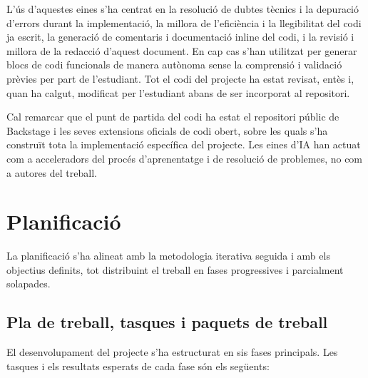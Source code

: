\documentclass[11pt,a4paper]{article}
\newcommand{\sectionintro}[1]{%
  \vspace{0.25em}%
  #1\par
}
\begin{document}
L'\'us d'aquestes eines s'ha centrat en la resoluci\'o de dubtes t\`ecnics i la depuraci\'o d'errors durant la implementaci\'o, la millora de l'efici\`encia i la llegibilitat del codi ja escrit, la generaci\'o de comentaris i documentaci\'o inline del codi, i la revisi\'o i millora de la redacci\'o d'aquest document. En cap cas s'han utilitzat per generar blocs de codi funcionals de manera aut\`onoma sense la comprensi\'o i validaci\'o pr\`evies per part de l'estudiant. Tot el codi del projecte ha estat revisat, ent\`es i, quan ha calgut, modificat per l'estudiant abans de ser incorporat al repositori.

Cal remarcar que el punt de partida del codi ha estat el repositori p\'ublic de Backstage i les seves extensions oficials de codi obert, sobre les quals s'ha constru\"it tota la implementaci\'o espec\'ifica del projecte. Les eines d'IA han actuat com a acceleradors del proc\'es d'aprenentatge i de resoluci\'o de problemes, no com a autores del treball.

\section{Planificaci\'o}
\sectionintro{La planificaci\'o s'ha alineat amb la metodologia iterativa seguida i amb els objectius definits, tot distribuint el treball en fases progressives i parcialment solapades.}

\subsection{Pla de treball, tasques i paquets de treball}
El desenvolupament del projecte s'ha estructurat en sis fases principals. Les tasques i els resultats esperats de cada fase s\'on els seg\"uents:
\end{document}
